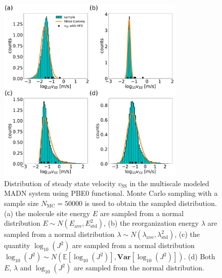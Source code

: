 \documentclass[letterpaper,12pt]{article}
\begin{document}
\begin{figure}[H]
    \centering
    \includegraphics[width=0.8\textwidth]{figs/MADN_HFX/fig_mle_MADN_withE_SS.pdf}
    \caption{Distribution of steady state velocity $v_\text{SS}$ in the multiscale modeled MADN system using PBE0 functional.
    Monte Carlo sampling with a sample size $N_\text{MC}=50000$ is used to obtain the sampled distribution.
    (a) the molecule site energy $E$ are sampled from a normal distribution $E \sim N(E_\text{ave},E^2_\text{std})$, (b) the reorganization energy $\lambda$ are sampled from a normal distribution $\lambda \sim N(\lambda_\text{ave},\lambda^2_\text{std})$, (c) the quantity $\log_{10}(J^2)$ are sampled from a normal distribution $\log_{10}(J^2) \sim N(\mathbb{E}[\log_{10}(J^2)], \textbf{Var}[\log_{10}(J^2)] )$. (d) Both$E$, $\lambda$ and $\log_{10}(J^2)$ are sampled from the normal distribution. }
    \label{fig:mle_MADN_withE_SS}
\end{figure}
\end{document}
